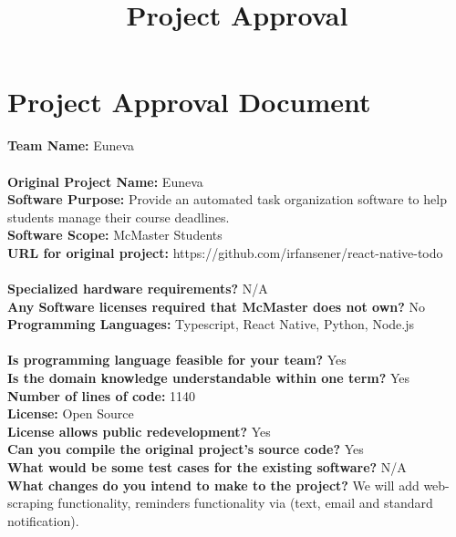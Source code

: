 \documentclass[11pt, oneside]{article}   	%
\title{Project Approval}
\author{}
\begin{document}
\marginpar{}
\section*{Project Approval Document}
\textbf{Team Name:} Euneva\\
\\
\textbf{Original Project Name:} Euneva\\
\textbf{Software Purpose:} Provide an automated task organization software to help students manage their course deadlines.\\
\textbf{Software Scope:} McMaster Students\\
\textbf{URL for original project:} https://github.com/irfansener/react-native-todo\\
\\
\textbf{Specialized hardware requirements?} N/A\\
\textbf{Any Software licenses required that McMaster does not own?} No\\
\textbf{Programming Languages:} Typescript, React Native, Python, Node.js\\
\\
\textbf{Is programming language feasible for your team?} Yes\\
\textbf{Is the domain knowledge understandable within one term?} Yes\\
\textbf{Number of lines of code:} 1140\\
\textbf{License:} Open Source\\
\textbf{License allows public redevelopment?} Yes\\
\textbf{Can you compile the original project's source code?} Yes\\
\textbf{What would be some test cases for the existing software?} N/A\\
\textbf{What changes do you intend to make to the project?} We will add web-scraping functionality, reminders functionality via (text, email and standard notification).\\
\end{document}
